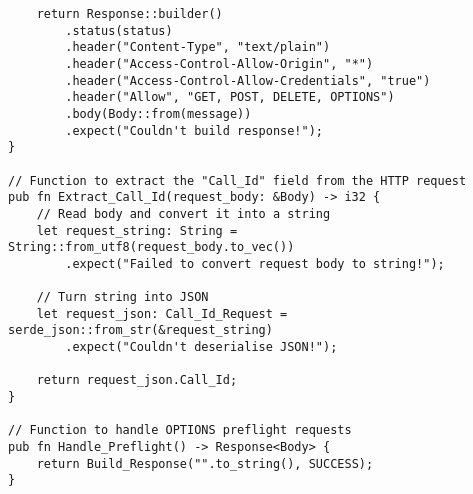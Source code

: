 \begin{verbatim}
    return Response::builder()
        .status(status)
        .header("Content-Type", "text/plain")
        .header("Access-Control-Allow-Origin", "*")
        .header("Access-Control-Allow-Credentials", "true")
        .header("Allow", "GET, POST, DELETE, OPTIONS")
        .body(Body::from(message))
        .expect("Couldn't build response!");
}

// Function to extract the "Call_Id" field from the HTTP request
pub fn Extract_Call_Id(request_body: &Body) -> i32 {
    // Read body and convert it into a string
    let request_string: String = String::from_utf8(request_body.to_vec())
        .expect("Failed to convert request body to string!");

    // Turn string into JSON
    let request_json: Call_Id_Request = serde_json::from_str(&request_string)
        .expect("Couldn't deserialise JSON!");

    return request_json.Call_Id;
}

// Function to handle OPTIONS preflight requests
pub fn Handle_Preflight() -> Response<Body> {
    return Build_Response("".to_string(), SUCCESS);
}
\end{verbatim}
